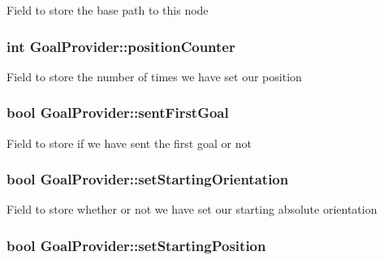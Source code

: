 \-Field to store the base path to this node \hypertarget{classGoalProvider_a9f314d13331aa611c5b96202742be0e9}{
\subsubsection[{position\-Counter}]{\setlength{\rightskip}{0pt plus 5cm}int {\bf \-Goal\-Provider\-::position\-Counter}}}\label{classGoalProvider_a9f314d13331aa611c5b96202742be0e9}
\-Field to store the number of times we have set our position \hypertarget{classGoalProvider_aa576e5466ea93048ed6c231f226c9658}{
\subsubsection[{sent\-First\-Goal}]{\setlength{\rightskip}{0pt plus 5cm}bool {\bf \-Goal\-Provider\-::sent\-First\-Goal}}}\label{classGoalProvider_aa576e5466ea93048ed6c231f226c9658}
\-Field to store if we have sent the first goal or not \hypertarget{classGoalProvider_a94c6c903648ec2ff61396d04686bc466}{
\subsubsection[{set\-Starting\-Orientation}]{\setlength{\rightskip}{0pt plus 5cm}bool {\bf \-Goal\-Provider\-::set\-Starting\-Orientation}}}\label{classGoalProvider_a94c6c903648ec2ff61396d04686bc466}
\-Field to store whether or not we have set our starting absolute orientation \hypertarget{classGoalProvider_aae2c69715ab4565f5d0e96cd16411444}{
\subsubsection[{set\-Starting\-Position}]{\setlength{\rightskip}{0pt plus 5cm}bool {\bf \-Goal\-Provider\-::set\-Starting\-Position}}}\label{classGoalProvider_aae2c69715ab4565f5d0e96cd16411444}
